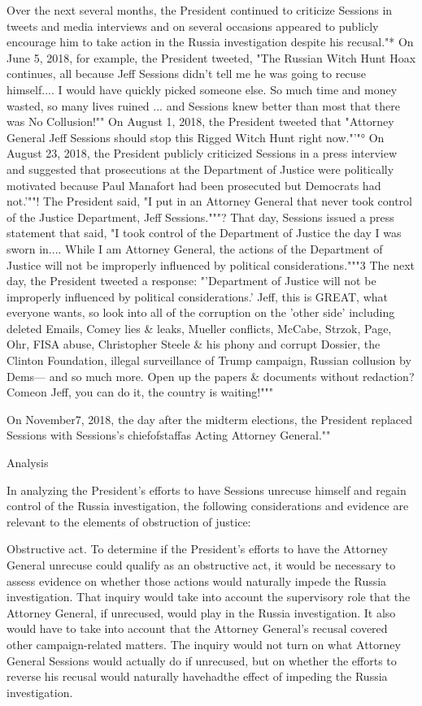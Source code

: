 Over the next several months, the President continued to criticize Sessions in tweets and media interviews and on several occasions appeared to publicly encourage him to take action in the Russia investigation despite his recusal."*
On June 5, 2018, for example, the President tweeted, "The Russian Witch Hunt Hoax continues, all because Jeff Sessions didn't tell me he was going to recuse himself.... I would have quickly picked someone else.
So much time and money wasted, so many lives ruined ... and Sessions knew better than most that there was No Collusion!""
On August 1, 2018, the President tweeted that "Attorney General Jeff Sessions should stop this Rigged Witch Hunt right now."'"°
On August 23, 2018, the President publicly criticized Sessions in a press interview and suggested that prosecutions at the Department of Justice were politically motivated because Paul Manafort had been prosecuted but Democrats had not.'""! The President said, "I put in an Attorney General that never took control of the Justice Department, Jeff Sessions."""?
That day, Sessions issued a press statement that said, "I took control of the Department of Justice the day I was sworn in....
While I am Attorney General, the actions of the Department of Justice will not be improperly influenced by political considerations."""3
The next day, the President tweeted a response: "'Department of Justice will not be improperly influenced by political considerations.'
Jeff, this is GREAT, what everyone wants, so look into all of the corruption on the 'other side' including deleted Emails, Comey lies \& leaks, Mueller conflicts, McCabe, Strzok, Page, Ohr, FISA abuse, Christopher Steele \& his phony and corrupt Dossier, the Clinton Foundation, illegal surveillance of Trump campaign, Russian collusion by Dems— and so much more.
Open up the papers \& documents without redaction? Comeon Jeff, you can do it, the country is waiting!"""

On November7, 2018, the day after the midterm elections, the President replaced Sessions with Sessions's chiefofstaffas Acting Attorney General.""

Analysis

In analyzing the President's efforts to have Sessions unrecuse himself and regain control of the Russia investigation, the following considerations and evidence are relevant to the elements of obstruction of justice:

Obstructive act.
To determine if the President's efforts to have the Attorney General unrecuse could qualify as an obstructive act, it would be necessary to assess evidence on whether those actions would naturally impede the Russia investigation.
That inquiry would take into account the supervisory role that the Attorney General, if unrecused, would play in the Russia investigation.
It also would have to take into account that the Attorney General's recusal covered other campaign-related matters.
The inquiry would not turn on what Attorney General Sessions would actually do if unrecused, but on whether the efforts to reverse his recusal would naturally havehadthe effect of impeding the Russia investigation.

